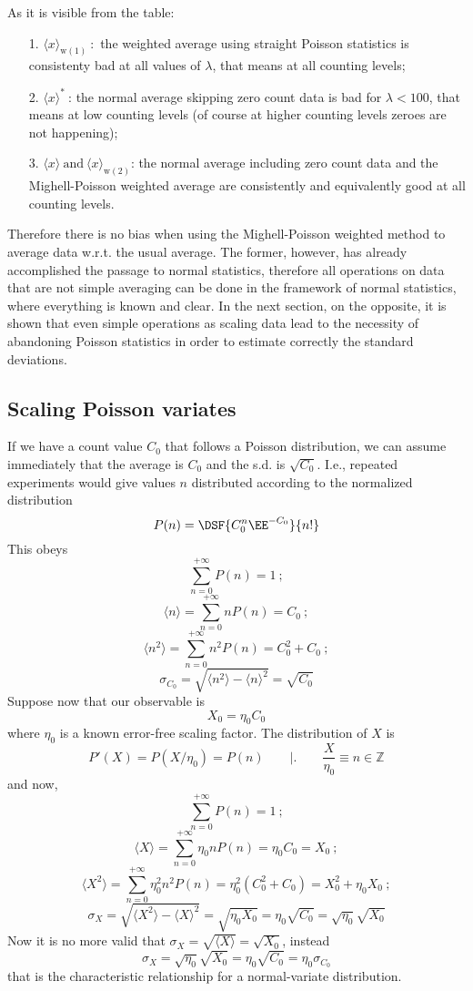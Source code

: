 As it is visible from the table:
\begin{itemize}
\item[1.\quad]{${\langle x \rangle_{\!\mathrm{w(1)}}}\ :$ the weighted average using straight Poisson statistics is consistenty bad at all values of $\lambda$, that means at all counting levels;}
\item[2.\quad]{${\langle x \rangle^*}\ $:  the normal average skipping zero count data is bad for $\lambda<100$, that means at low counting levels (of course at higher counting levels zeroes are not happening);}
\item[3.\quad]{${\langle x \rangle}\ \text{and}\ {\langle x \rangle_{\!\mathrm{w(2)}}}$: the normal average including zero count data and the Mighell-Poisson weighted average 
are consistently and equivalently good at all counting levels.}
\end{itemize}
Therefore there is no bias when using the Mighell-Poisson weighted method to average data w.r.t. the usual average. The former, however, 
has already accomplished the passage to normal statistics, therefore all operations on data that are not simple averaging can be done in 
the framework of normal statistics, where everything is known and clear. In the next section, on the opposite, it is shown that 
even simple operations as scaling data lead to the necessity of abandoning Poisson statistics in order to estimate correctly the standard deviations.





\subsection{Scaling Poisson variates}\label{sec:3}

If we have a count value $C_0$ that follows a Poisson distribution, 
we can assume immediately that the average is $C_0$ and the s.d. is $\sqrt{C_0}$. 
I.e., repeated experiments would give values $n$ 
distributed according to the normalized distribution
\[
P(n)=\DSF{C_0^n\EE^{-C_0}
}{
n!}
\]
This obeys
\[
\mathop{\sum}_{n=0}^{+\infty}
P(n)=1\ ;
\]
\[
\langle n\rangle=\mathop{\sum}_{n=0}^{+\infty}
nP(n)=C_0\ ;
\]
\[
\langle n^2\rangle=\mathop{\sum}_{n=0}^{+\infty}
n^2 P(n)=C_0^2+C_0\ ;
\]
\[
\sigma_{C_0}=\sqrt{\langle n^2\rangle-\langle n\rangle^2}=\sqrt{C_0}
\]
Suppose now that
our observable is 
\[
X_0=\eta_0 C_0
\]
where $\eta_0$ is a known error-free scaling factor. 
The distribution of $X$ is
\[
P'(X)=P(X/\eta_0)=P(n)\qquad\Biggl|\Biggr.\qquad \frac{X}{\eta_0}\equiv n\in\mathbb{Z}
\]
and now,
\[
\mathop{\sum}_{n=0}^{+\infty}
P(n)=1\ ;
\]
\[
\langle X\rangle=\mathop{\sum}_{n=0}^{+\infty}
\eta_0 nP(n)=\eta_0 C_0=X_0\ ;
\]
\[
\langle X^2\rangle=\mathop{\sum}_{n=0}^{+\infty}
\eta_0^2 n^2 P(n)=\eta_0^2(C_0^2+C_0)=X_0^2+\eta_0 X_0\ ;
\]
\[
\sigma_X=\sqrt{\langle X^2\rangle-\langle X\rangle^2}=\sqrt{\eta_0 X_0}=\eta_0\sqrt{C_0}=\sqrt{\eta_0}\sqrt{X_0}
\]
Now it is no more valid that $\sigma_X=\sqrt{\langle X\rangle}=\sqrt{X_0}$, instead
\[
\sigma_X=\sqrt{\eta_0}\sqrt{X_0}=\eta_0\sqrt{C_0}=\eta_0\sigma_{C_0}
\]
that is the characteristic relationship for a normal-variate distribution.


